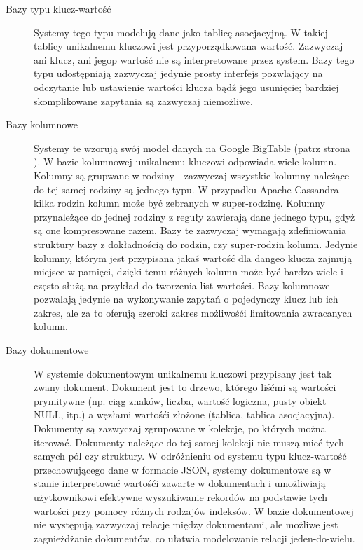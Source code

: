 \begin{description}
 \item[Bazy typu klucz-wartość]
 Systemy tego typu modelują dane jako tablicę asocjacyjną.
 W takiej tablicy unikalnemu kluczowi jest przyporządkowana wartość.
 Zazwyczaj ani klucz, ani jegop wartość nie są interpretowane przez system.
 Bazy tego typu udostępniają zazwyczaj jedynie prosty interfejs pozwlający na odczytanie lub ustawienie wartości klucza bądź jego usunięcie; bardziej skomplikowane zapytania są zazwyczaj niemożliwe.
 
 \item[Bazy kolumnowe]
 Systemy te wzorują swój model danych na Google BigTable (patrz strona \pageref{google-bigtable-model-danych}).
 W bazie kolumnowej unikalnemu kluczowi odpowiada wiele kolumn.
 Kolumny są grupwane w rodziny - zazwyczaj wszystkie kolumny należące do tej samej rodziny są jednego typu.
 W przypadku Apache Cassandra kilka rodzin kolumn może być zebranych w super-rodzinę.
 Kolumny przynależące do jednej rodziny z reguły zawierają dane jednego typu, gdyż są one kompresowane razem.
 Bazy te zazwyczaj wymagają zdefiniowania struktury bazy z dokładnością do rodzin, czy super-rodzin kolumn.
 Jedynie kolumny, którym jest przypisana jakaś wartość dla dangeo klucza zajmują miejsce w pamięci, dzięki temu różnych kolumn może być bardzo wiele i często służą na przykład do tworzenia list wartości.
 Bazy kolumnowe pozwalają jedynie na wykonywanie zapytań o pojedynczy klucz lub ich zakres, ale za to oferują szeroki zakres możliwośći limitowania zwracanych kolumn.

 \item[Bazy dokumentowe]
 W systemie dokumentowym unikalnemu kluczowi przypisany jest tak zwany dokument.
 Dokument jest to drzewo, którego liśćmi są wartości prymitywne (np. ciąg znaków, liczba, wartość logiczna, pusty obiekt NULL, itp.) a węzłami wartośći złożone (tablica, tablica asocjacyjna).
 Dokumenty są zazwyczaj zgrupowane w kolekcje, po których można iterować.
 Dokumenty należące do tej samej kolekcji nie muszą mieć tych samych pól czy struktury.
 W odróżnieniu od systemu typu klucz-wartość przechowującego dane w formacie JSON, systemy dokumentowe są w stanie interpretować wartośći zawarte w dokumentach i umożliwiają użytkownikowi efektywne wyszukiwanie rekordów na podstawie tych wartości przy pomocy różnych rodzajów indeksów.
 W bazie dokumentowej nie występują zazwyczaj relacje między dokumentami, ale możliwe jest zagnieżdżanie dokumentów, co ułatwia modelowanie relacji jeden-do-wielu.
 

\end{description}
